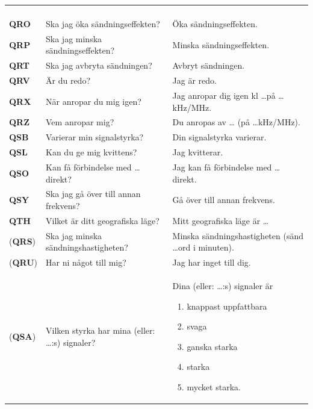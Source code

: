 \begin{table}
\begin{threeparttable}
\begin{tabular}{lp{6cm}p{6cm}}
\begin{enumerate}[noitemsep]
                   \end{enumerate} \\
    \textbf{QRO} & Ska jag öka sändningseffekten? & Öka sändningseffekten. \\
    \textbf{QRP} & Ska jag minska sändningseffekten? & Minska sändningseffekten. \\
    \textbf{QRT} & Ska jag avbryta sändningen? & Avbryt sändningen. \\
    \textbf{QRV} & Är du redo? & Jag är redo. \\
    \textbf{QRX} & När anropar du mig igen? & Jag anropar dig igen kl \dots på \dots kHz/MHz.\\
    \textbf{QRZ} & Vem anropar mig? & Du anropas av \dots\tnote{*} (på \dots kHz/MHz). \\
    \textbf{QSB} & Varierar min signalstyrka? & Din signalstyrka varierar. \\
    \textbf{QSL} & Kan du ge mig kvittens? & Jag kvitterar. \\
    \textbf{QSO} & Kan få förbindelse med \dots \tnote{*} direkt? &
                   Jag kan få förbindelse med \dots \tnote{*} direkt. \\
    \textbf{QSY} & Ska jag gå över till annan frekvens? & Gå över till annan frekvens. \\
    \textbf{QTH} & Vilket är ditt geografiska läge? & Mitt geografiska läge är \dots \\
    (\textbf{QRS}) & Ska jag minska sändningshastigheten? & Minska sändningshastigheten
                                                            (sänd \dots ord i minuten). \\
    (\textbf{QRU}) & Har ni något till mig? & Jag har inget till dig. \\
    (\textbf{QSA}) & Vilken styrka har mina (eller: \dots:s)\tnote{*} signaler?
                   & Dina (eller: \dots:s)\tnote{*} signaler är
                     \vspace{-\topsep}
                     \begin{enumerate}[noitemsep]
     	                 \item knappast uppfattbara
    	                 \item svaga
    	                 \item ganska starka
    	                 \item starka
    	                 \item mycket starka.
                     \end{enumerate} \\

\end{tabular}
\end{threeparttable}
\end{table}
